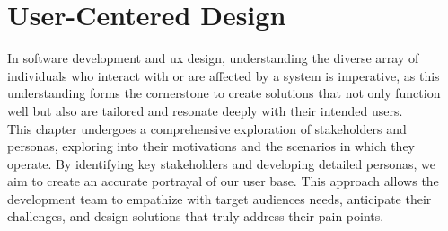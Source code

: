 \chapter{User-Centered Design}
\label{chapter:stakeholders_personas} 
In software development and \ac{ux} design, understanding the diverse array of individuals who interact with or are affected by a system is imperative, as this understanding forms the cornerstone to create solutions that not only function well but also are tailored and resonate deeply with their intended users. 
\\ 
This chapter undergoes a comprehensive exploration of stakeholders and personas, exploring into their motivations and the scenarios in which they operate. By identifying key stakeholders and developing detailed personas, we aim to create an accurate portrayal of our user base. This approach allows the development team to empathize with target audiences needs, anticipate their challenges, and design solutions that truly address their pain points. 
\\ 

